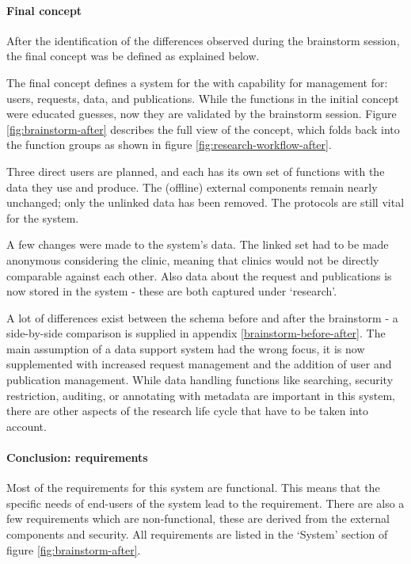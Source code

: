 \paragraph{Final concept}

After the identification of the differences observed during the brainstorm session, the final concept was be defined as explained below.

The final concept defines a system for the \projectdata{} with capability for management for: users, requests, data, and publications.
While the functions in the initial concept were educated guesses, now they are validated by the brainstorm session.
Figure \ref{fig:brainstorm-after} describes the full view of the concept, which folds back into the function groups as shown in figure \ref{fig:research-workflow-after}.

Three direct users are planned, and each has its own set of functions with the data they use and produce.
The (offline) external components remain nearly unchanged; only the unlinked data has been removed. The protocols are still vital for the system.

A few changes were made to the system's data.
The linked set had to be made anonymous considering the clinic, meaning that clinics would not be directly comparable against each other.
Also data about the request and publications is now stored in the system - these are both captured under `research'.

A lot of differences exist between the schema before and after the brainstorm - a side-by-side comparison is supplied in appendix \ref{brainstorm-before-after}.
The main assumption of a data support system had the wrong focus, it is now supplemented with increased request management and the addition of user and publication management.
While data handling functions like searching, security restriction, auditing, or annotating with metadata are important in this system, there are other aspects of the research life cycle that have to be taken into account.


\paragraph{Conclusion: requirements}
Most of the requirements for this system are functional.
This means that the specific needs of end-users of the system lead to the requirement.
There are also a few requirements which are non-functional, these are derived from the external components and security.
All requirements are listed in the `System' section of figure \ref{fig:brainstorm-after}.

